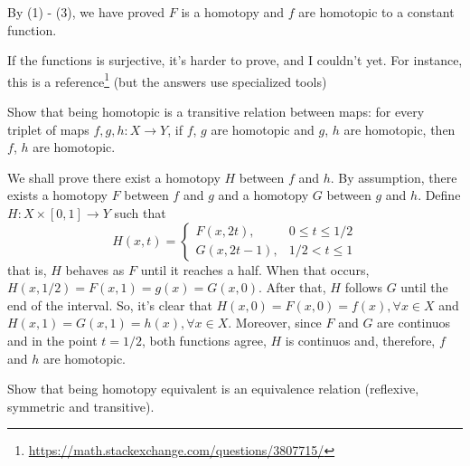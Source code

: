 By (1) - (3), we have proved $F$ is a homotopy and $f$ are homotopic to a
constant function. 

\begin{remark}
    If the functions is surjective, it's harder to prove, and I couldn't yet.
    For instance, this is a
    reference\footnote{\url{https://math.stackexchange.com/questions/3807715/}
    } (but the answers use specialized tools) 
\end{remark}

\noindent\linia

\begin{exercise}
    Show that being homotopic is a transitive relation between maps: for every
    triplet of maps $f, g, h: X \to Y$, if $f$, $g$ are homotopic and $g$, $h$
    are homotopic, then $f$, $h$ are homotopic.
\end{exercise}

We shall prove there exist a homotopy $H$ between $f$ and $h$. By assumption,
there exists a homotopy $F$ between $f$ and $g$ and a homotopy $G$ between $g$
and $h$. Define $H: X \times [0,1] \to Y$ such that 
$$
H(x,t) = \begin{cases}
    F(x,2t), &0 \le t \le 1/2 \\
    G(x,2t - 1), &1/2 < t \le 1   
\end{cases}
$$
that is, $H$ behaves as $F$ until it reaches a half. When that occurs,
$H(x,1/2) = F(x,1) = g(x) = G(x, 0)$. After that, $H$ follows $G$ until the
end of the interval. So, it's clear that $H(x,0) = F(x,0) = f(x), \forall x
\in X$ and $H(x,1) = G(x,1) = h(x), \forall x \in X$. Moreover, since $F$ and
$G$ are continuos and in the point $t = 1/2$, both functions agree, $H$ is
continuos and, therefore, $f$ and $h$ are homotopic. 

\noindent\linia

\begin{exercise}
    Show that being homotopy equivalent is an equivalence relation (reflexive,
    symmetric and transitive).
\end{exercise}

